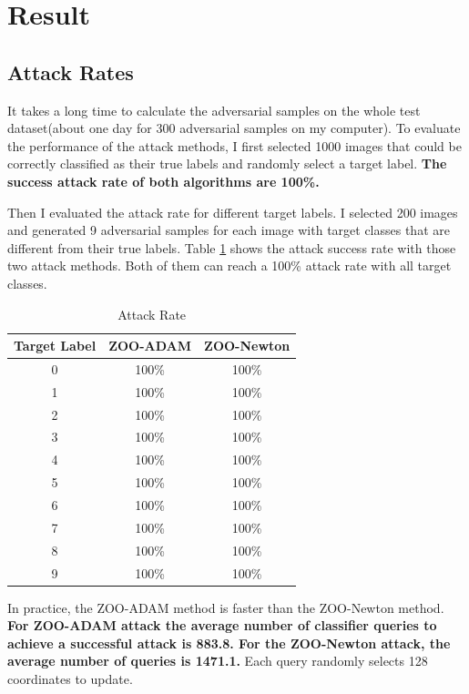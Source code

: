 \documentclass[a4paper]{article}
\begin{document}
\section{Result}


\subsection{Attack Rates}
It takes a long time to calculate the adversarial samples on the whole test dataset(about one day for 300 adversarial samples on my computer). To evaluate the performance of the attack methods, I first selected 1000 images that could be correctly classified as their true labels and randomly select a target label. \textbf{The success attack rate of both algorithms are 100\%. }

Then I evaluated the attack rate for different target labels.
I selected 200 images and generated 9 adversarial samples for each image with target classes that are different from their true labels. Table \ref{ar} shows the attack success rate with those two attack methods. Both of them can reach a 100\% attack rate with all target classes. 

\begin{table}[h]
\centering
\begin{tabular}{ccc}
\hline
Target Label&ZOO-ADAM&ZOO-Newton\\
\hline
0& 100\%&100\%\\
1& 100\%&100\%\\
2& 100\%&100\%\\
3& 100\%&100\%\\
4& 100\%&100\%\\
5& 100\%&100\%\\
6& 100\%&100\%\\
7& 100\%&100\%\\
8& 100\%&100\%\\
9& 100\%&100\%\\
\hline
\end{tabular}
\label{ar}
\caption{Attack Rate}
\end{table}
In practice, the ZOO-ADAM method is faster than the ZOO-Newton method.
\textbf{For ZOO-ADAM attack the average number of classifier queries to achieve a successful attack is 883.8.
For the ZOO-Newton attack, the average number of queries is 1471.1. }Each query randomly selects 128 coordinates to update.
\end{document}
